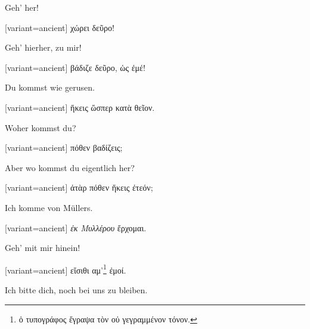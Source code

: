 Geh' her!

\switchcolumn

\begin{greek}[variant=ancient]%
χώρει δεῦρο!

\end{greek}%
\switchcolumn*

Geh' hierher, zu mir!

\switchcolumn

\begin{greek}[variant=ancient]%
βάδιζε δεῦρο, ὡς ἐμέ!

\end{greek}%
\switchcolumn*

Du kommst wie gerusen.

\switchcolumn

\begin{greek}[variant=ancient]%
ἥκεις ὥσπερ κατὰ θεῖον.

\end{greek}%
\switchcolumn*

Woher kommst du?

\switchcolumn

\begin{greek}[variant=ancient]%
πόθεν βαδίζεις;

\end{greek}%
\switchcolumn*

Aber wo kommst du eigentlich her?

\switchcolumn

\begin{greek}[variant=ancient]%
ἀτὰρ πόθεν ἥκεις ἐτεόν;

\end{greek}%
\switchcolumn*

Ich komme von Müllers.

\switchcolumn

\begin{greek}[variant=ancient]%
\emph{ἐκ Μυλλέρου} ἔρχομαι.

\end{greek}%
\switchcolumn*

Geh' mit mir hinein!

\switchcolumn

\begin{greek}[variant=ancient]%
εἴσιθι αμ'\footnote{ὁ τυπογράφος ἔγραψα τὸν οὐ γεγραμμένον τόνον.}
ἐμοί.

\end{greek}%
\switchcolumn*

Ich bitte dich, noch bei uns zu bleiben.

